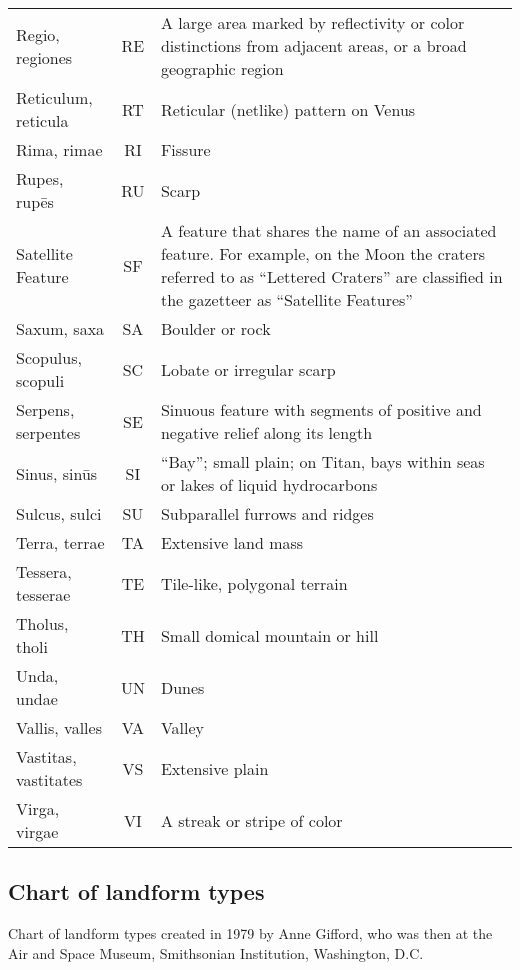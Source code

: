 \begin{longtable}{l|c|p{72mm}}
Regio, regiones       & RE & A large area marked by reflectivity or color distinctions from adjacent areas, 
                             or a broad geographic region\\%
Reticulum, reticula   & RT & Reticular (netlike) pattern on Venus\\%
Rima, rimae           & RI & Fissure\\%
Rupes, rupēs          & RU & Scarp\\\midrule
Satellite Feature     & SF & A feature that shares the name of an associated feature. 
                             For example, on the Moon the craters referred to as ``Lettered Craters'' 
							 are classified in the gazetteer as ``Satellite Features''\\%
Saxum, saxa           & SA & Boulder or rock\\%
Scopulus, scopuli     & SC & Lobate or irregular scarp\\%
Serpens, serpentes    & SE & Sinuous feature with segments of positive and negative relief along its length\\%
Sinus, sinūs          & SI & ``Bay''; small plain; on Titan, bays within seas or lakes of liquid hydrocarbons\\%
Sulcus, sulci         & SU & Subparallel furrows and ridges\\\midrule
Terra, terrae         & TA & Extensive land mass\\%
Tessera, tesserae     & TE & Tile-like, polygonal terrain\\%
Tholus, tholi         & TH & Small domical mountain or hill\\\midrule
Unda, undae           & UN & Dunes\\\midrule
Vallis, valles        & VA & Valley\\%
Vastitas, vastitates  & VS & Extensive plain\\%
Virga, virgae         & VI & A streak or stripe of color\\\bottomrule
\end{longtable}

\subsection{Chart of landform types}
\label{sec:Nomenclature:DescriptorTerms:Chart}

Chart of landform types created in 1979 by Anne Gifford, who was then at the Air and Space Museum, Smithsonian Institution, Washington, D.C.

